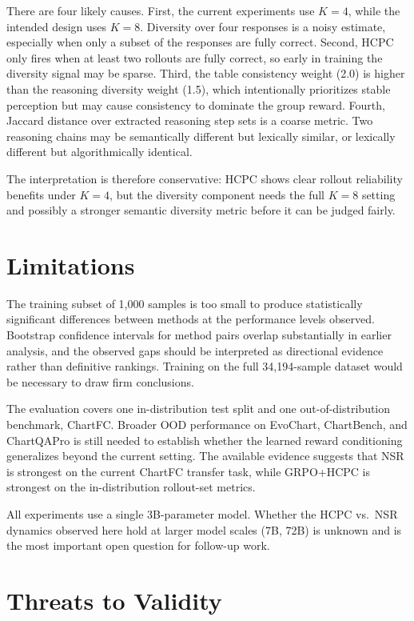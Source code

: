 \documentclass{iutbscthesis}
\begin{document}
There are four likely causes. First, the current experiments use $K=4$, while the intended design uses $K=8$. Diversity over four responses is a noisy estimate, especially when only a subset of the responses are fully correct. Second, HCPC only fires when at least two rollouts are fully correct, so early in training the diversity signal may be sparse. Third, the table consistency weight (2.0) is higher than the reasoning diversity weight (1.5), which intentionally prioritizes stable perception but may cause consistency to dominate the group reward. Fourth, Jaccard distance over extracted reasoning step sets is a coarse metric. Two reasoning chains may be semantically different but lexically similar, or lexically different but algorithmically identical.

The interpretation is therefore conservative: HCPC shows clear rollout reliability benefits under $K=4$, but the diversity component needs the full $K=8$ setting and possibly a stronger semantic diversity metric before it can be judged fairly.

\section{Limitations}

The training subset of 1,000 samples is too small to produce statistically significant differences between methods at the performance levels observed. Bootstrap confidence intervals for method pairs overlap substantially in earlier analysis, and the observed gaps should be interpreted as directional evidence rather than definitive rankings. Training on the full 34,194-sample dataset would be necessary to draw firm conclusions.

The evaluation covers one in-distribution test split and one out-of-distribution benchmark, ChartFC. Broader OOD performance on EvoChart, ChartBench, and ChartQAPro is still needed to establish whether the learned reward conditioning generalizes beyond the current setting. The available evidence suggests that NSR is strongest on the current ChartFC transfer task, while GRPO+HCPC is strongest on the in-distribution rollout-set metrics.

All experiments use a single 3B-parameter model. Whether the HCPC vs.\ NSR dynamics observed here hold at larger model scales (7B, 72B) is unknown and is the most important open question for follow-up work.

\section{Threats to Validity}
\end{document}
